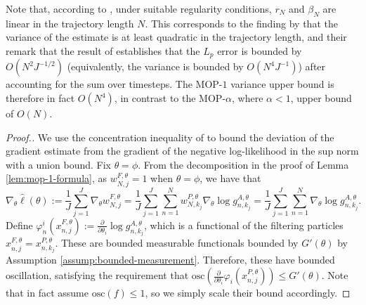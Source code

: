 Note that, according to \cite{delMoral11}, under suitable regularity conditions, $r_N$ and $\beta_N$ are linear in the trajectory length $N$. This corresponds to the finding by \cite{poyiadjis11} that the variance of the estimate is at least quadratic in the trajectory length, and their remark that the result of \cite{delMoral03} establishes that the $L_p$ error is bounded by $O(N^2J^{-1/2})$ (equivalently, the variance is bounded by $O(N^4J^{-1})$) after accounting for the sum over timesteps. The MOP-$1$ variance upper bound is therefore in fact $O(N^4)$, in contrast to the MOP-$\alpha$, where $\alpha<1$, upper bound of $O(N)$. 

\begin{proof}[Proof.]
We use the concentration inequality of \cite{delMoral11} to bound the deviation of the gradient estimate from the gradient of the negative log-likelihood in the sup norm with a union bound. Fix $\theta = \phi$.
From the decomposition in the proof of Lemma \ref{lem:mop-1-formula}, as $w_{N, j}^{F, \theta}=1$ when $\theta=\phi$, we have that
\begin{equation}
\nabla_\theta \hat{\ell}(\theta):=\frac{1}{J} \sum_{j=1}^J \nabla_\theta w_{N, j}^{F, \theta}=\frac{1}{J} \sum_{j=1}^J\sum_{n=1}^N  w_{N, k_j}^{P, \theta} \nabla_\theta \log g_{n,k_j}^{A,\theta} = \frac{1}{J} \sum_{j=1}^J\sum_{n=1}^N \nabla_\theta \log g_{n,k_j}^{A,\theta}.
\end{equation}
Define $\varphi_n^i(x_{n,j}^{F,\theta}) := \frac{\partial}{\partial\theta_i} \log g_{n,k_j}^{A,\theta}$, which is a functional of the filtering particles $x_{n,j}^{F,\theta} = x_{n,k_j}^{P,\theta}$. These are bounded measurable functionals bounded by $G'(\theta)$ by Assumption \ref{assump:bounded-measurement}. Therefore, these have bounded oscillation, satisfying the requirement that $\text{osc} \left(\frac{\partial}{\partial\theta_i} \varphi_i(x_{n,j}^{P,\theta}) \right) \leq G'(\theta)$. Note that \cite{delMoral11} in fact assume $\text{osc}(f) \leq 1$, so we simply scale their bound accordingly.


\end{proof}
